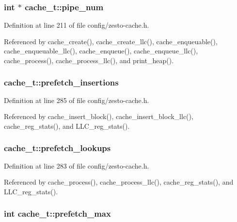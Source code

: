 \subsubsection[{pipe\_\-num}]{\setlength{\rightskip}{0pt plus 5cm}int $\ast$ {\bf cache\_\-t::pipe\_\-num}}\label{structcache__t_b3cd043ebdcf2c96f34d8f472f4ac5ea}




Definition at line 211 of file config/zesto-cache.h.

Referenced by cache\_\-create(), cache\_\-create\_\-llc(), cache\_\-enqueuable(), cache\_\-enqueuable\_\-llc(), cache\_\-enqueue(), cache\_\-enqueue\_\-llc(), cache\_\-process(), cache\_\-process\_\-llc(), and print\_\-heap().
\subsubsection[{prefetch\_\-insertions}]{ {\bf cache\_\-t::prefetch\_\-insertions}}\label{structcache__t_f1c9aea1fcd785adbe526de991176c44}




Definition at line 285 of file config/zesto-cache.h.

Referenced by cache\_\-insert\_\-block(), cache\_\-insert\_\-block\_\-llc(), cache\_\-reg\_\-stats(), and LLC\_\-reg\_\-stats().
\subsubsection[{prefetch\_\-lookups}]{ {\bf cache\_\-t::prefetch\_\-lookups}}\label{structcache__t_160a60c05728b7888f728a96aede2730}




Definition at line 283 of file config/zesto-cache.h.

Referenced by cache\_\-process(), cache\_\-process\_\-llc(), cache\_\-reg\_\-stats(), and LLC\_\-reg\_\-stats().
\subsubsection[{prefetch\_\-max}]{\setlength{\rightskip}{0pt plus 5cm}int {\bf cache\_\-t::prefetch\_\-max}}\label{structcache__t_639a7ac5ea0206cfa35c8c86235bf7a4}




